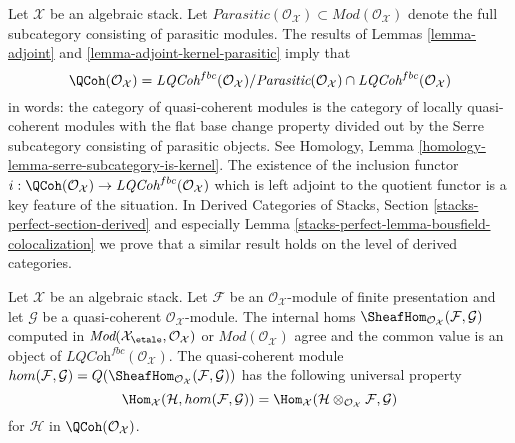\begin{remark}
\label{remark-bousfield-colocalization}
Let $\mathcal{X}$ be an algebraic stack. Let
$\textit{Parasitic}(\mathcal{O}_\mathcal{X}) \subset
\textit{Mod}(\mathcal{O}_\mathcal{X})$ denote the
full subcategory consisting of parasitic modules. The results of
Lemmas \ref{lemma-adjoint} and \ref{lemma-adjoint-kernel-parasitic}
imply that
$$
\QCoh(\mathcal{O}_\mathcal{X}) =
\textit{LQCoh}^{fbc}(\mathcal{O}_\mathcal{X}) /
\textit{Parasitic}(\mathcal{O}_\mathcal{X})
\cap \textit{LQCoh}^{fbc}(\mathcal{O}_\mathcal{X})
$$
in words: the category of quasi-coherent modules is the category
of locally quasi-coherent modules with the flat base change property
divided out by the Serre subcategory consisting of parasitic objects.
See Homology, Lemma \ref{homology-lemma-serre-subcategory-is-kernel}.
The existence of the inclusion functor
$i : \QCoh(\mathcal{O}_\mathcal{X}) \to
\textit{LQCoh}^{fbc}(\mathcal{O}_\mathcal{X})$
which is left adjoint to the quotient functor is a key feature of
the situation. In Derived Categories of Stacks, Section
\ref{stacks-perfect-section-derived} and especially
Lemma \ref{stacks-perfect-lemma-bousfield-colocalization}
we prove that a similar result holds on the level of derived categories.
\end{remark}

\begin{lemma}
\label{lemma-internal-hom-fp-into-qcoh}
Let $\mathcal{X}$ be an algebraic stack. Let $\mathcal{F}$ be an
$\mathcal{O}_\mathcal{X}$-module of finite presentation and let
$\mathcal{G}$ be a quasi-coherent $\mathcal{O}_\mathcal{X}$-module.
The internal homs
$\SheafHom_{\mathcal{O}_\mathcal{X}}(\mathcal{F}, \mathcal{G})$
computed in
$\textit{Mod}(\mathcal{X}_\etale, \mathcal{O}_\mathcal{X})$ or
$\textit{Mod}(\mathcal{O}_\mathcal{X})$ agree and the common value
is an object of $\textit{LQCoh}^{fbc}(\mathcal{O}_\mathcal{X})$.
The quasi-coherent module
$
hom(\mathcal{F}, \mathcal{G}) =
Q(\SheafHom_{\mathcal{O}_\mathcal{X}}(\mathcal{F}, \mathcal{G}))
$
has the following universal property
$$
\Hom_\mathcal{X}(\mathcal{H}, hom(\mathcal{F}, \mathcal{G})) =
\Hom_\mathcal{X}(\mathcal{H} \otimes_{\mathcal{O}_\mathcal{X}} \mathcal{F},
\mathcal{G})
$$
for $\mathcal{H}$ in $\QCoh(\mathcal{O}_\mathcal{X})$.
\end{lemma}

